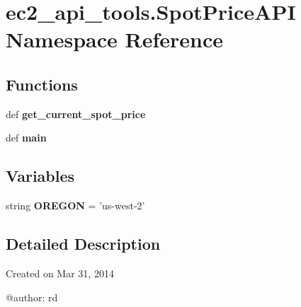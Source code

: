 \hypertarget{namespaceec2__api__tools_1_1SpotPriceAPI}{\section{ec2\-\_\-api\-\_\-tools.\-Spot\-Price\-A\-P\-I Namespace Reference}
\label{namespaceec2__api__tools_1_1SpotPriceAPI}
}
\subsection*{Functions}
\begin{DoxyCompactItemize}
\item 
\hypertarget{namespaceec2__api__tools_1_1SpotPriceAPI_ab04a7b1d82817dfcf9a6ec13e43a7e47}{def {\bfseries get\-\_\-current\-\_\-spot\-\_\-price}}\label{namespaceec2__api__tools_1_1SpotPriceAPI_ab04a7b1d82817dfcf9a6ec13e43a7e47}

\item 
\hypertarget{namespaceec2__api__tools_1_1SpotPriceAPI_a242542349acba56a422d5da6316965c0}{def {\bfseries main}}\label{namespaceec2__api__tools_1_1SpotPriceAPI_a242542349acba56a422d5da6316965c0}

\end{DoxyCompactItemize}
\subsection*{Variables}
\begin{DoxyCompactItemize}
\item 
\hypertarget{namespaceec2__api__tools_1_1SpotPriceAPI_a1d5b4ffc54929c9d5be136cb431e899e}{string {\bfseries O\-R\-E\-G\-O\-N} = 'us-\/west-\/2'}\label{namespaceec2__api__tools_1_1SpotPriceAPI_a1d5b4ffc54929c9d5be136cb431e899e}

\end{DoxyCompactItemize}


\subsection{Detailed Description}
\begin{DoxyVerb}Created on Mar 31, 2014

@author: rd
\end{DoxyVerb}
 